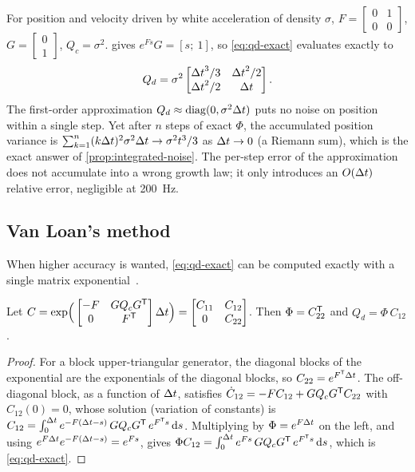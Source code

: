 \begin{example}
\label{ex:double-integrator-qd}
For position and velocity driven by white acceleration of density $\sigma$, $F = \begin{bmatrix}0&1\\0&0\end{bmatrix}$, $G = \begin{bmatrix}0\\1\end{bmatrix}$, $Q_c = \sigma^2$.
 gives $e^{Fs}G = [s;\ 1]$, so \eqref{eq:qd-exact} evaluates exactly to
\begin{equation}
  Q_d = \sigma^2\begin{bmatrix} {\Delta t}^3/3 & {\Delta t}^2/2 \\ {\Delta t}^2/2 & {\Delta t} \end{bmatrix}.
\end{equation}
The first-order approximation $Q_d \approx \operatorname{diag}(0, \sigma^2{\Delta t})$ puts no noise on position within a single step. Yet after $n$ steps of exact $\Phi$, the
accumulated position variance is $\sum_{k=1}^{n} (k{\Delta t})^2\sigma^2{\Delta t} \to \sigma^2 t^3/3$ as ${\Delta t}\to0$ (a Riemann sum), which is the exact answer of
\cref{prop:integrated-noise}. The per-step error of the approximation does not accumulate into a wrong growth law; it only introduces an $O({\Delta t})$
relative error, negligible at 200~Hz.
\end{example}

\subsection{Van Loan's method}

When higher accuracy is wanted, \eqref{eq:qd-exact} can be computed exactly with a single matrix exponential~\cite{vanloan1978}.

\begin{proposition}
\label{prop:vanloan}
Let $C = \exp\!\Big(\begin{bmatrix} -F & GQ_cG^{\mathsf{T}} \\ 0 & F^{\mathsf{T}} \end{bmatrix}{\Delta t}\Big) = \begin{bmatrix} C_{11} & C_{12} \\ 0 & C_{22}\end{bmatrix}$. Then
$\Phi = C_{22}^{\mathsf{T}}$ and $Q_d = \Phi\, C_{12}$.
\end{proposition}
\begin{proof}
For a block upper-triangular generator, the diagonal blocks of the exponential are the exponentials of the diagonal blocks, so $C_{22} = e^{F^{\mathsf{T}}{\Delta t}}$.
The off-diagonal block, as a function of ${\Delta t}$, satisfies $\dot C_{12} = -FC_{12} + GQ_cG^{\mathsf{T}} C_{22}$ with $C_{12}(0) = 0$, whose solution (variation of constants)
is $C_{12} = \int_0^{\Delta t} e^{-F({\Delta t} - s)}\,GQ_cG^{\mathsf{T}}\,e^{F^{\mathsf{T}} s}\,\mathrm{d} s$. Multiplying by $\Phi = e^{F{\Delta t}}$ on the left, and using
$e^{F{\Delta t}}e^{-F({\Delta t} - s)} = e^{Fs}$, gives $\Phi C_{12} = \int_0^{\Delta t} e^{Fs}\,GQ_cG^{\mathsf{T}}\,e^{F^{\mathsf{T}} s}\,\mathrm{d} s$, which is \eqref{eq:qd-exact}.
\end{proof}

